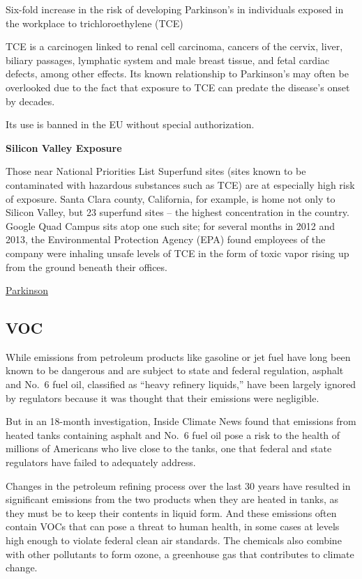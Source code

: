 \documentclass[
]{book}
\begin{document}
Six-fold increase in the risk of developing Parkinson's in individuals exposed in the workplace to trichloroethylene (TCE)

TCE is a carcinogen linked to renal cell carcinoma, cancers of the cervix, liver, biliary passages, lymphatic system and male breast tissue, and fetal cardiac defects, among other effects. Its known relationship to Parkinson's may often be overlooked due to the fact that exposure to TCE can predate the disease's onset by decades.

Its use is banned in the EU without special authorization.

\textbf{Silicon Valley Exposure}

Those near National Priorities List Superfund sites (sites known to be contaminated with hazardous substances such as TCE) are at especially high risk of exposure. Santa Clara county, California, for example, is home not only to Silicon Valley, but 23 superfund sites -- the highest concentration in the country. Google Quad Campus sits atop one such site; for several months in 2012 and 2013, the Environmental Protection Agency (EPA) found employees of the company were inhaling unsafe levels of TCE in the form of toxic vapor rising up from the ground beneath their offices.

\href{https://www.theguardian.com/commentisfree/2021/apr/07/rates-of-parkinsons-disease-are-exploding-a-common-chemical-may-be-to-blame}{Parkinson}

\hypertarget{voc}{%
\subsection{VOC}\label{voc}}

While emissions from petroleum products like gasoline or jet fuel have long been known to be dangerous and are subject to state and federal regulation, asphalt and No.~6 fuel oil, classified as ``heavy refinery liquids,'' have been largely ignored by regulators because it was thought that their emissions were negligible.

But in an 18-month investigation, Inside Climate News found that emissions from heated tanks containing asphalt and No.~6 fuel oil pose a risk to the health of millions of Americans who live close to the tanks, one that federal and state regulators have failed to adequately address.

Changes in the petroleum refining process over the last 30 years have resulted in significant emissions from the two products when they are heated in tanks, as they must be to keep their contents in liquid form. And these emissions often contain VOCs that can pose a threat to human health, in some cases at levels high enough to violate federal clean air standards. The chemicals also combine with other pollutants to form ozone, a greenhouse gas that contributes to climate change.
\end{document}
